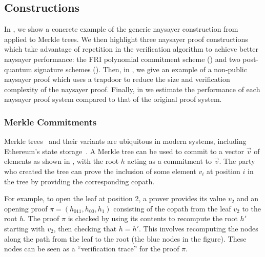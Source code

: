 \subsection{Constructions}\label{sec:naysayer_apps}

In , we show a concrete example of the generic naysayer construction from  applied to Merkle trees. We then highlight three naysayer proof constructions which take advantage of repetition in the verification algorithm to achieve better naysayer performance: the FRI polynomial commitment scheme () and two post-quantum signature schemes (). 
Then, in , we give an example of a non-public naysayer proof which uses a trapdoor to reduce the size and verification complexity of the naysayer proof. %
Finally, in  we
estimate the performance of each naysayer proof system compared to that of the original proof system.

\subsubsection{Merkle Commitments}\label{sec:merkle_naysayer}


Merkle trees~\cite{C:Merkle87} and their variants are ubiquitous in modern systems, including Ethereum's state storage~\cite{ethereum_trie}. A Merkle tree can be used to commit to a vector $\vec{v}$ of elements as shown in , with the root $h$ acting as a commitment to $\vec{v}$. The party who created the tree can prove the inclusion of some element $v_i$ at position $i$ in the tree by providing the corresponding copath. 

For example, to open the leaf at position 2, a prover provides its value $v_2$ and an opening proof $\pi = (h_{011}, h_{00}, h_{1})$ consisting of the copath from the leaf $v_2$ to the root $h$. The proof $\pi$ is checked by using its contents to recompute the root $h'$ starting with $v_2$, then checking that $h = h'$. This involves recomputing the nodes along the path from the leaf to the root (the blue nodes in the figure). These nodes can be seen as a ``verification trace'' for the proof $\pi$.
    
